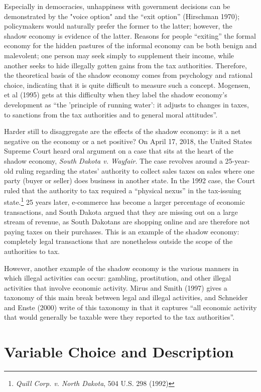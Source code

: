\documentclass[12pt]{report}
\begin{document}
Especially in democracies, unhappiness with government decisions can be demonstrated by the "voice option" and the ``exit option'' (Hirschman 1970); policymakers would naturally prefer the former to the latter; however, the shadow economy is evidence of the latter. Reasons for people ``exiting'' the formal economy for the hidden pastures of the informal economy can be both benign and malevolent; one person may seek simply to supplement their income, while another seeks to hide illegally gotten gains from the tax authorities. Therefore, the theoretical basis of the shadow economy comes from psychology and rational choice, indicating that it is quite difficult to measure such a concept. Mogensen, et al (1995) gets at this difficulty when they label the shadow economy's development as ``the 'principle of running water': it adjusts to changes in taxes, to sanctions from the tax authorities and to general moral attitudes''.

Harder still to disaggregate are the effects of the shadow economy: is it a net negative on the economy or a net positive? On April 17, 2018, the United States Supreme Court heard oral argument on a case that sits at the heart of the shadow economy, \textit{South Dakota v. Wayfair}. The case revolves around a 25-year-old ruling regarding the states' authority to collect sales taxes on sales where one party (buyer or seller) does business in another state. In the 1992 case, the Court ruled that the authority to tax required a ``physical nexus'' in the tax-issuing state.\footnote{\textit{Quill Corp. v. North Dakota}, 504 U.S. 298 (1992)} 25 years later, e-commerce has become a larger percentage of economic transactions, and South Dakota argued that they are missing out on a large stream of revenue, as South Dakotans are shopping online and are therefore not paying taxes on their purchases. This is an example of the shadow economy: completely legal transactions that are nonetheless outside the scope of the authorities to tax. 

However, another example of the shadow economy is the various manners in which illegal activities can occur: gambling, prostitution, and other illegal activities that involve economic activity. Mirus and Smith (1997) gives a taxonomy of this main break between legal and illegal activities, and Schneider and Enste (2000) write of this taxonomy in that it captures ``all economic activity that would generally be taxable were they reported to the tax authorities''. 


\section*{Variable Choice and Description}
\end{document}
